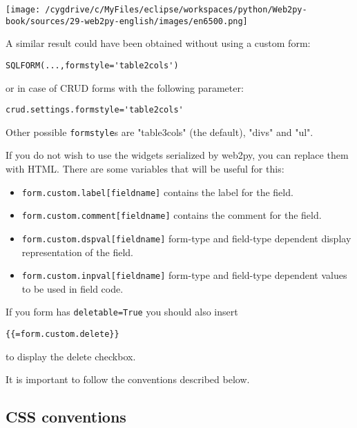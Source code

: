 \documentclass[justified,sixbynine,notoc]{tufte-book}
\def\ft{\small\tt}
\begin{document}
\begin{fullwidth}
\goodbreak\begin{center}\texttt{[image: /cygdrive/c/MyFiles/eclipse/workspaces/python/Web2py-book/sources/29-web2py-english/images/en6500.png]}\end{center}


A similar result could have been obtained without using a custom form:

\begin{lstlisting}
SQLFORM(...,formstyle='table2cols')
\end{lstlisting}
\noindent or in case of CRUD forms with the following parameter:

\begin{lstlisting}
crud.settings.formstyle='table2cols'
\end{lstlisting}

Other possible {\ft formstyle}s are "table3cols" (the default), "divs" and "ul".

If you do not wish to use the widgets serialized by web2py, you can replace them with HTML. There are some variables that will be useful for this:
\begin{itemize}
\item {\ft form.custom.label[fieldname]} contains the label for the field.

\item {\ft form.custom.comment[fieldname]} contains the comment for the field.

\item {\ft form.custom.dspval[fieldname]} form-type and field-type dependent display representation of the field.

\item {\ft form.custom.inpval[fieldname]} form-type and field-type dependent values to be used in field code.
\end{itemize}

If you form has {\ft deletable=True} you should also insert

\begin{lstlisting}[keywords={}]
{{=form.custom.delete}}
\end{lstlisting}
\noindent to display the delete checkbox.

It is important to follow the conventions described below.

\goodbreak\subsection{CSS conventions}


\end{fullwidth}
\end{document}
